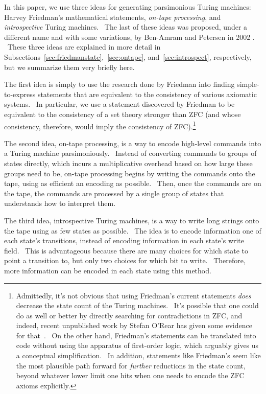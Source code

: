 \documentclass[11pt]{article}
\begin{document}
In this paper, we use three ideas for generating parsimonious Turing machines: Harvey Friedman's mathematical statements, \emph{on-tape processing}, and \emph{introspective} Turing machines. \ The last of these ideas was proposed, under a different name and with some variations, by Ben-Amram and Petersen in 2002 \cite{benamram}. \ These three ideas are explained in more detail in Subsections~\ref{sec:friedmanstate},~\ref{sec:ontape}, and~\ref{sec:introspect}, respectively, but we summarize them very briefly here.

The first idea is simply to use the research done by Friedman into finding simple-to-express statements that are equivalent to the consistency of various axiomatic systems. \ In particular, we use a statement discovered by Friedman to be equivalent to the consistency of a set theory stronger than ZFC (and whose consistency, therefore, would imply the consistency of ZFC).\footnote{Admittedly, it's not obvious that using Friedman's current statements \emph{does} decrease the state count of the Turing machines. \ It's possible that one could do as well or better by directly searching for contradictions in ZFC, and indeed, recent unpublished work by Stefan O'Rear has given some evidence for that~\cite{comments}. \ On the other hand, Friedman's statements can be translated into code without using the apparatus of first-order logic, which arguably gives us a conceptual simplification. \ In addition, statements like Friedman's seem like the most plausible path forward for \emph{further} reductions in the state count, beyond whatever lower limit one hits when one needs to encode the ZFC axioms explicitly.}~\cite{friedman}

The second idea, on-tape processing, is a way to encode high-level commands into a Turing machine parsimoniously. \ Instead of converting commands to groups of states directly, which incurs a multiplicative overhead based on how large these groups need to be, on-tape processing begins by writing the commands onto the tape, using as efficient an encoding as possible. \ Then, once the commands are on the tape, the commands are processed by a single group of states that understands how to interpret them.

The third idea, introspective Turing machines, is a way to write long strings onto the tape using as few states as possible. \ The idea is to encode information one of each state's transitions, instead of encoding information in each state's write field. \ This is advantageous because there are many choices for which state to point a transition to, but only two choices for which bit to write. \ Therefore, more information can be encoded in each state using this method.
\end{document}
